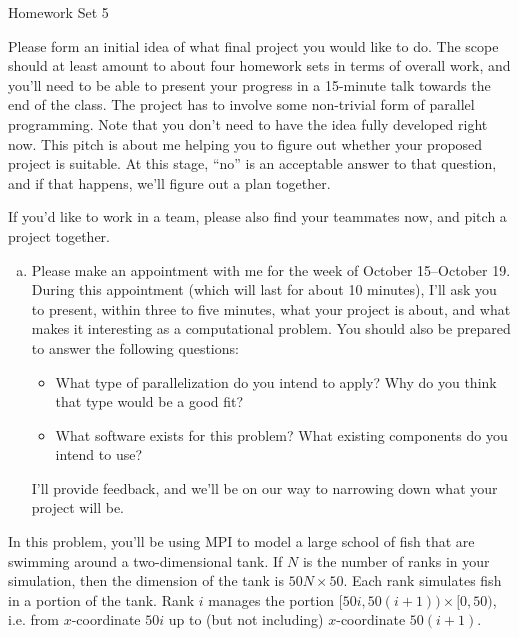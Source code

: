 \documentclass[11pt]{article}
\begin{document}
%
{Homework Set 5}


\bigskip
{}

Please form an initial idea of what final project you would like to
do. The scope should at least amount to about four homework sets in
terms of overall work, and you'll need to be able to present your
progress in a 15-minute talk towards the end of the class. The project
has to involve some non-trivial form of parallel programming. Note
that you don't need to have the idea fully developed right now. This
pitch is about me helping you to figure out whether your proposed
project is suitable. At this stage, ``no'' is an acceptable answer to
that question, and if that happens, we'll figure out a plan together.

If you'd like to work in a team, please also find your teammates now,
and pitch a project together.

\begin{enumerate}[a)]
  \item Please make an appointment with me for the week of
    October 15--October 19. During this appointment (which will last
    for about 10 minutes), I'll ask you to present, within three to
    five minutes, what your project is about, and what makes it
    interesting as a computational problem. You should also be
    prepared to answer the following questions:
    \begin{itemize}
      \item What type of parallelization do you intend to apply? Why
        do you think that type would be a good fit?
      \item What software exists for this problem? What existing
        components do you intend to use?
    \end{itemize}
    I'll provide feedback, and we'll be on our way to narrowing down
    what your project will be.
\end{enumerate}

\bigskip
{}

In this problem, you'll be using MPI to model a large school of fish that are
swimming around a two-dimensional tank. If $N$ is the number of ranks
in your simulation, then the dimension of the tank is $50N \times 50$.
Each rank simulates fish in a portion of the tank. Rank $i$ manages the
portion $[50i,50(i+1))\times [0,50)$, i.e. from $x$-coordinate $50i$ up to
(but not including) $x$-coordinate $50(i+1)$.
\end{document}
